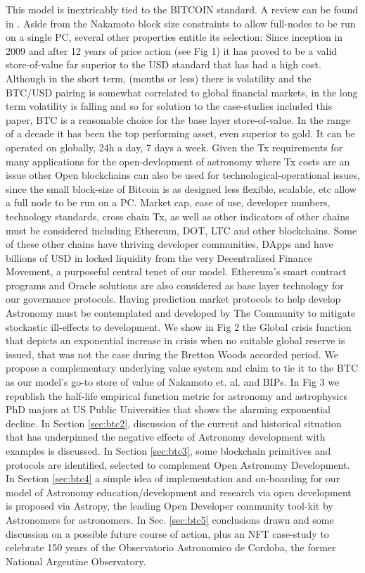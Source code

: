 \documentclass[final,5p,times,twocolumn,authoryear]{elsarticle}
\begin{document}
This model is inextricably tied to the BITCOIN standard. A review can be found in \citet{Hansen2020Book}. Aside from the Nakamoto block size constraints to allow full-nodes to be run on a single PC, several other properties entitle its selection: Since inception in 2009 and after 12 years of price action (see Fig 1) it has proved to be a valid store-of-value far superior to the USD standard that has had a high cost. Although in the short term, (months or less) there is volatility and the BTC/USD pairing is somewhat correlated to global financial markets, in the long term volatility is falling and so for solution to the case-studies included this paper,  BTC is a reasonable choice for the base layer store-of-value. In the range of a decade it has been the top performing asset, even superior to gold. It can be operated on globally, 24h a day, 7 days a week. Given the Tx requirements for many applications for the open-devlopment of astronomy where Tx costs are an issue other Open blockchains can also be used for technological-operational issues, since the small block-size of Bitcoin is as designed less flexible, scalable, etc allow a full node to be run on a PC. Market cap, ease of use, developer numbers, technology standards, cross chain Tx, as well as other indicators of other chains must be considered including Ethereum, DOT, LTC and other blockchains. Some of these other chains have thriving developer communities, DApps and have billions of USD in locked liquidity from the very Decentralized Finance Movement, a purposeful central tenet of our model. Ethereum's smart contract programs and Oracle solutions are also considered as base layer technology for our governance protocols. Having prediction market protocols to help develop Astronomy must be contemplated and developed by The Community to mitigate stockastic ill-effects to development.  We show in Fig 2 the Global crisis function that depicts an exponential increase in crisis when no suitable global reserve is issued, that was not the case during the Bretton Woods accorded period. We propose a complementary underlying value system and claim to tie it to the BTC as our model's go-to store of value of Nakamoto et. al. and BIPs. In Fig 3 we republish the half-life empirical function metric for astronomy and astrophysics PhD majors at US Public Universities that shows the alarming exponential decline.  In Section \ref{sec:btc2}, discussion of the current and historical situation that has underpinned the negative effects of Astronomy development with examples is discussed. In Section  \ref{sec:btc3}, some blockchain primitives and protocols are identified, selected to complement Open Astronomy Development.  In Section \ref{sec:btc4} a simple idea of implementation and on-boarding for our model of Astronomy education/development and research via open development is proposed via Astropy, the leading Open Developer community tool-kit by Astronomers for astronomers. In Sec. \ref{sec:btc5} conclusions drawn and some discussion on a possible future course of action, plus an NFT case-study to celebrate 150 years of the Observatorio Astronomico de Cordoba, the former National Argentine Observatory. 
\end{document}
